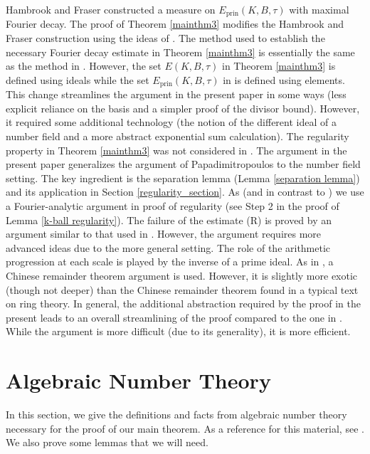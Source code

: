 \documentclass{amsart}
\numberwithin{equation}{section}
\theoremstyle{definition}
\theoremstyle{definition}
\newcommand{\prin}{\mathrm{prin}}
\begin{document}
Hambrook and Fraser \cite{hambrook-fraser-Rn} constructed a measure on 
$E_{\prin}(K,B,\tau)$ 
with  maximal Fourier decay. 
The proof of Theorem \ref{mainthm3} 
modifies 
the Hambrook and Fraser construction 
using the ideas of 
\cite{fraser-hambrook-ryou}. 
The method used to establish the necessary Fourier decay estimate in Theorem \ref{mainthm3}  is essentially the same as the method in  \cite{hambrook-fraser-Rn}. 
However, the set $E(K,B,\tau)$ in Theorem \ref{mainthm3} is defined using ideals while the set $E_{\prin}(K,B,\tau)$ in \cite{hambrook-fraser-Rn} is defined using elements. 
This change streamlines the argument in the present paper in some ways (less explicit reliance on the basis and a simpler proof of the divisor bound). 
However, it required some additional technology (the notion of the different ideal of a number field and a more abstract exponential sum calculation). 
The regularity property in Theorem \ref{mainthm3} was not considered in \cite{hambrook-fraser-Rn}. 
The argument in the present paper generalizes the argument of Papadimitropoulos \cite{pa-thesis} to the number field setting. 
The key ingredient is the separation lemma (Lemma \ref{separation lemma}) and its application in Section \ref{regularity_section}. 
As \cite{fraser-hambrook-ryou} (and in contrast to \cite{pa-thesis}) we use a Fourier-analytic argument in proof of regularity (see Step 2 in the proof of Lemma \ref{k-ball regularity}). 
The failure of the estimate (R) is proved by an argument similar to that used in \cite{fraser-hambrook-ryou}. 
However, the argument requires more advanced ideas due to the more general setting. The role of the arithmetic progression at each scale is played by the inverse of a prime ideal. 
As in \cite{fraser-hambrook-ryou}, a Chinese remainder theorem argument is used. However, it is slightly more exotic (though not deeper) than the Chinese remainder theorem found in a typical text on ring theory. In general, the additional abstraction required by the proof in the present leads to an overall streamlining of the proof compared to the one in \cite{hambrook-fraser-Rn}. While the argument is more difficult (due to its generality), it is more efficient. 



\section{Algebraic Number Theory}\label{Algebraic Number Theory: Basics section}

In this section, we give the definitions and facts from algebraic number theory necessary for the proof of our main theorem. As a reference for this material, see \cite{Jarvis14}. 
We also prove some lemmas that we will need. 
 
\end{document}
